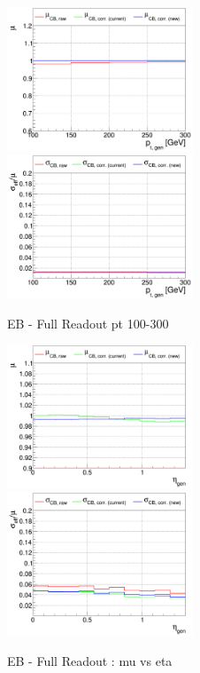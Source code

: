 \begin{figure}
\includegraphics[width=0.495\textwidth]{./ECAL_plots/plotsNOPU/EB/FULL/pdf/GENPT/EBFULL_GENPT_0100_0300_MuOverBins.pdf}
\includegraphics[width=0.495\textwidth]{./ECAL_plots/plotsPU/EB/FULL/pdf/GENPT/EBFULL_GENPT_0100_0300_EffSigmaOverBins.pdf}
\caption{EB - Full Readout pt 100-300}
\end{figure}

\begin{figure}
\includegraphics[width=0.495\textwidth]{./ECAL_plots/plotsNOPU/EB/FULL/pdf/GENETA/EBFULL_GENETA_0005_0020_MuOverBins.pdf}
\includegraphics[width=0.495\textwidth]{./ECAL_plots/plotsPU/EB/FULL/pdf/GENETA/EBFULL_GENETA_0005_0020_EffSigmaOverBins.pdf}
\caption{EB - Full Readout : mu vs eta}
\end{figure}


